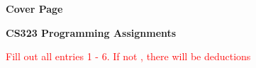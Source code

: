 \documentclass[12pt]{article}
\begin{document}
\begin{center}
\large{\textbf{Cover Page}}

\textbf{CS323 Programming Assignments}

\textcolor{red}{Fill out all entries 1 - 6. If not , there will be deductions}
\end{center}
\end{document}
